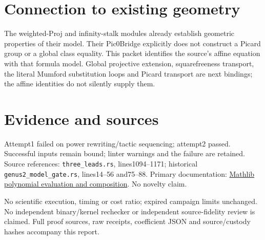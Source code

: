 \documentclass[10pt]{article}
\begin{document}
\section*{Connection to existing geometry}
The weighted-Proj and infinity-stalk modules already establish geometric properties of their model. Their Pic0Bridge explicitly does not construct a Picard group or a global class equality. This packet identifies the source's affine equation with that formula model. Global projective extension, squarefreeness transport, the literal Mumford substitution loops and Picard transport are next bindings; the affine identities do not silently supply them.
\section*{Evidence and sources}
Attempt1 failed on power rewriting/tactic sequencing; attempt2 passed. Successful inputs remain bound; linter warnings and the failure are retained. Source references: \texttt{three\_leads.rs}, lines1094--1171; historical \texttt{genus2\_model\_gate.rs}, lines14--56 and75--88. Primary documentation: \href{https://leanprover-community.github.io/mathlib4_docs/Mathlib/Algebra/Polynomial/Eval/Defs.html}{Mathlib polynomial evaluation and composition}. No novelty claim.

No scientific execution, timing or cost ratio; expired campaign limits unchanged. No independent binary/kernel rechecker or independent source-fidelity review is claimed. Full proof sources, raw receipts, coefficient JSON and source/custody hashes accompany this report.
\end{document}
